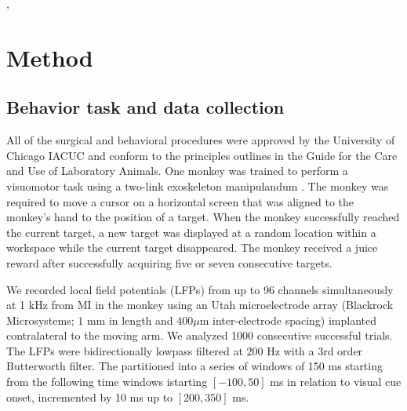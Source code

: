 \documentclass[letterpaper, 9pt, conference]{ieeeconf}
\begin{document}
\cite{doug2006betawave}, \cite{taka2011humanbetawave}

\section{Method}
\label{sec:method}

\subsection{Behavior task and data collection}

All of the surgical and behavioral procedures were approved by the
University of Chicago IACUC and conform to the principles outlines
in the Guide for the Care and Use of Laboratory Animals. One
monkey was trained to perform a visuomotor task using a two-link
exoskeleton manipulandum \cite{ref:Scott99}. The monkey was
required to move a cursor on a horizontal screen that was aligned
to the monkey's hand to the position of a target. When the monkey
successfully reached the current target, a new target was
displayed at a random location within a workspace while the
current target disappeared. The monkey received a juice reward
after successfully acquiring five or seven consecutive targets.

We recorded local field potentials (LFPs) from up to 96 channels simultaneously at 1 kHz from MI in
the monkey using an Utah microelectrode array (Blackrock
Microsystems; $1$ mm in length and $400 \mu$m inter-electrode
spacing) implanted contralateral to the moving arm. We analyzed 1000 consecutive
successful trials. The LFPs were bidirectionally lowpass filtered at $200$ Hz with a 3rd order Butterworth filter. The partitioned into a series of windows of 150 ms starting from  the following time windows istarting  $[-100, 50]$ ms in relation to visual cue onset, incremented by 10 ms up to 
$[200, 350]$ ms.
\end{document}
